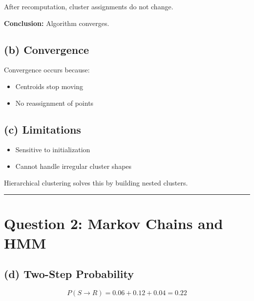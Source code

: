 \documentclass[12pt]{article}
\begin{document}
After recomputation, cluster assignments do not change.

\textbf{Conclusion:} Algorithm converges.



\subsection*{(b) Convergence}

Convergence occurs because:
\begin{itemize}
\item Centroids stop moving
\item No reassignment of points
\end{itemize}



\subsection*{(c) Limitations}

\begin{itemize}
\item Sensitive to initialization
\item Cannot handle irregular cluster shapes
\end{itemize}

Hierarchical clustering solves this by building nested clusters.

\noindent\rule{\textwidth}{0.4pt}


\section*{Question 2: Markov Chains and HMM}

\subsection*{(d) Two-Step Probability}

\[
P(S \rightarrow R) = 0.06 + 0.12 + 0.04 = 0.22
\]

\begin{center}
\end{center}
\end{document}
